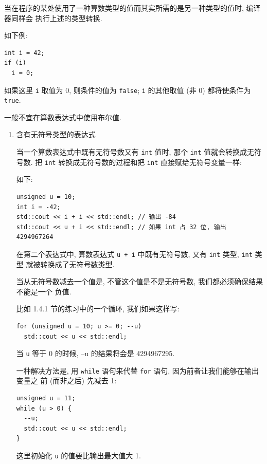 \documentclass[lang=cn]{elegantbook}
\begin{document}
当在程序的某处使用了一种算数类型的值而其实所需的是另一种类型的值时, 编译器同样会
执行上述的类型转换.

如下例:

\begin{verbatim}
int i = 42;
if (i)
  i = 0;
\end{verbatim}

如果这里 \texttt{i} 取值为 0, 则条件的值为 \texttt{false}; \texttt{i} 的其他取值 (非 0) 都将使条件为 \texttt{true}.

一般不宜在算数表达式中使用布尔值.

\begin{enumerate}
\item 含有无符号类型的表达式
\label{sec:orgd014014}

当一个算数表达式中既有无符号数又有 \texttt{int} 值时, 那个 \texttt{int} 值就会转换成无符号数.
把 \texttt{int} 转换成无符号数的过程和把 \texttt{int} 直接赋给无符号变量一样:

如下:

\begin{verbatim}
unsigned u = 10;
int i = -42;
std::cout << i + i << std::endl; // 输出 -84
std::cout << u + i << std::endl; // 如果 int 占 32 位, 输出 4294967264
\end{verbatim}

在第二个表达式中, 算数表达式 \texttt{u + i} 中既有无符号数, 又有 \texttt{int} 类型, \texttt{int} 类型
就被转换成了无符号数类型.

当从无符号数减去一个值是, 不管这个值是不是无符号数, 我们都必须确保结果不能是一个
负值.

比如 1.4.1 节的练习中的一个循环, 我们如果这样写:

\begin{verbatim}
for (unsigned u = 10; u >= 0; --u)
  std::cout << u << std::endl;
\end{verbatim}

当 \texttt{u} 等于 0 的时候, --u 的结果将会是 4294967295.

一种解决方法是, 用 \texttt{while} 语句来代替 \texttt{for} 语句, 因为前者让我们能够在输出变量之
前 (而非之后) 先减去 1:

\begin{verbatim}
unsigned u = 11;
while (u > 0) {
  --u;
  std::cout << u << std::endl;
}
\end{verbatim}

这里初始化 \texttt{u} 的值要比输出最大值大 1.
\end{enumerate}
\end{document}
